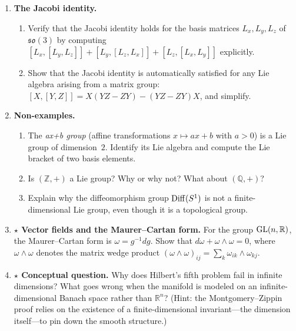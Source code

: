 \begin{enumerate}
    \item \textbf{The Jacobi identity.}
    \begin{enumerate}
        \item Verify that the Jacobi identity holds for the basis matrices $L_x, L_y, L_z$ of $\mathfrak{so}(3)$ by computing $[L_x, [L_y, L_z]] + [L_y, [L_z, L_x]] + [L_z, [L_x, L_y]]$ explicitly.
        \item Show that the Jacobi identity is automatically satisfied for any Lie algebra arising from a matrix group: $[X,[Y,Z]] = X(YZ - ZY) - (YZ - ZY)X$, and simplify.
    \end{enumerate}

    \item \textbf{Non-examples.}
    \begin{enumerate}
        \item The \emph{ax+b group} (affine transformations $x \mapsto ax + b$ with $a > 0$) is a Lie group of dimension~$2$. Identify its Lie algebra and compute the Lie bracket of two basis elements.
        \item Is $(\mathbb{Z}, +)$ a Lie group? Why or why not? What about $(\mathbb{Q}, +)$?
        \item Explain why the diffeomorphism group $\operatorname{Diff}(S^1)$ is not a finite-dimensional Lie group, even though it is a topological group.
    \end{enumerate}

    \item \textbf{$\star$ Vector fields and the Maurer--Cartan form.} For the group $\operatorname{GL}(n,\mathbb{R})$, the Maurer--Cartan form is $\omega = g^{-1} dg$. Show that $d\omega + \omega \wedge \omega = 0$, where $\omega \wedge \omega$ denotes the matrix wedge product $(\omega \wedge \omega)_{ij} = \sum_k \omega_{ik} \wedge \omega_{kj}$.

    \item \textbf{$\star$ Conceptual question.} Why does Hilbert's fifth problem fail in infinite dimensions? What goes wrong when the manifold is modeled on an infinite-dimensional Banach space rather than $\mathbb{R}^n$? (Hint: the Montgomery--Zippin proof relies on the existence of a finite-dimensional invariant---the dimension itself---to pin down the smooth structure.)
\end{enumerate}
